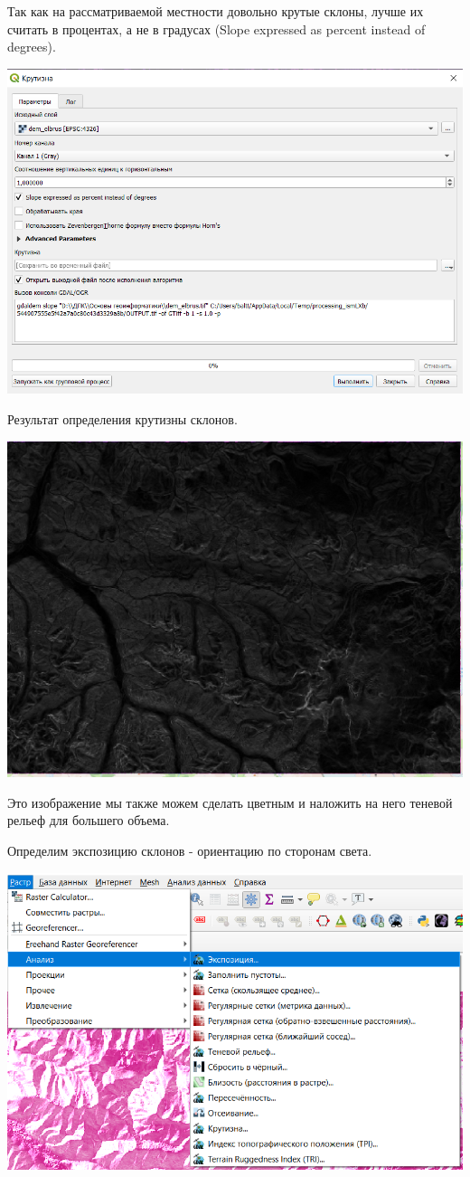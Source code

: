 \documentclass[
]{book}
\begin{document}
Так как на рассматриваемой местности довольно крутые склоны, лучше их считать в процентах, а не в градусах (Slope expressed as percent instead of degrees).

\includegraphics{figures/74.PNG}

Результат определения крутизны склонов.

\includegraphics{figures/75.PNG}

Это изображение мы также можем сделать цветным и наложить на него теневой рельеф для большего объема.

Определим экспозицию склонов - ориентацию по сторонам света.

\includegraphics{figures/76.png}
\end{document}
